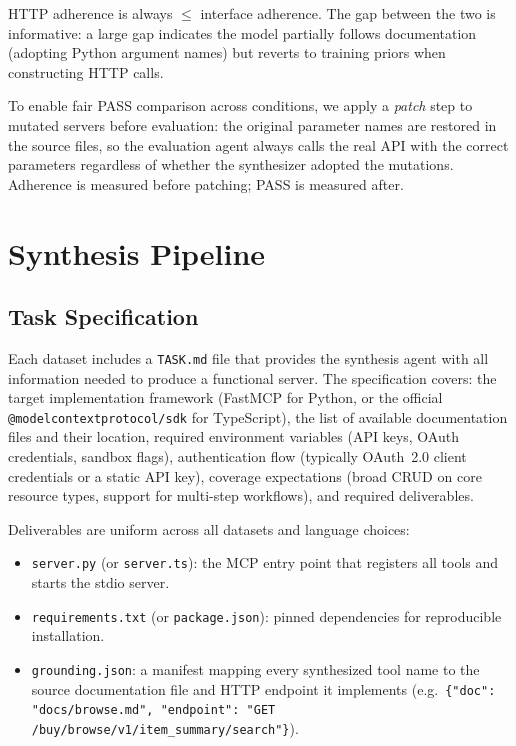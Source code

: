 \documentclass[12pt]{report}
\begin{document}
\noindent
HTTP adherence is always $\leq$ interface adherence. The gap between the two
is informative: a large gap indicates the model partially follows documentation
(adopting Python argument names) but reverts to training priors when
constructing HTTP calls.

To enable fair PASS comparison across conditions, we apply a \emph{patch}
step to mutated servers before evaluation: the original parameter names are
restored in the source files, so the evaluation agent always calls the real
API with the correct parameters regardless of whether the synthesizer adopted
the mutations. Adherence is measured before patching; PASS is measured after.

\section{Synthesis Pipeline}

\subsection{Task Specification}

Each dataset includes a \texttt{TASK.md} file that provides the synthesis
agent with all information needed to produce a functional server. The
specification covers: the target implementation framework (FastMCP for Python,
or the official \texttt{@modelcontextprotocol/sdk} for TypeScript), the list
of available documentation files and their location, required environment
variables (API keys, OAuth credentials, sandbox flags), authentication flow
(typically OAuth~2.0 client credentials or a static API key), coverage
expectations (broad CRUD on core resource types, support for multi-step
workflows), and required deliverables.

Deliverables are uniform across all datasets and language choices:
\begin{itemize}
  \item \texttt{server.py} (or \texttt{server.ts}): the MCP entry point that
    registers all tools and starts the stdio server.
  \item \texttt{requirements.txt} (or \texttt{package.json}): pinned
    dependencies for reproducible installation.
  \item \texttt{grounding.json}: a manifest mapping every synthesized tool
    name to the source documentation file and HTTP endpoint it implements
    (e.g.\ \texttt{\{"doc": "docs/browse.md", "endpoint":
    "GET /buy/browse/v1/item\_summary/search"\}}).
\end{itemize}
\end{document}
